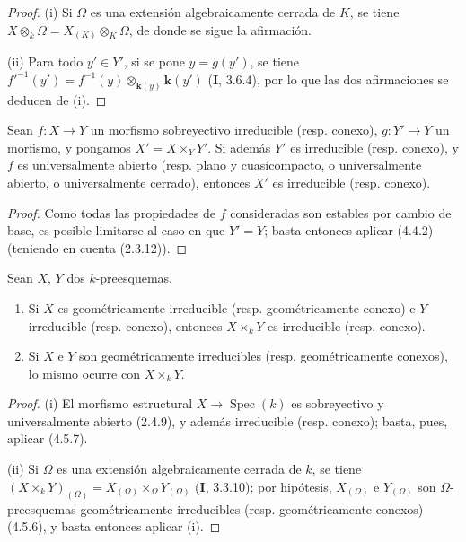 \begin{proof}
(i) Si $\Omega$ es una extensión algebraicamente cerrada de $K$, se
tiene $X\otimes_k\Omega=X_{(K)}\otimes_K\Omega$, de donde se sigue la
afirmación.

(ii) Para todo $y'\in Y'$, si se pone $y=g(y')$, se tiene
$f'^{-1}(y')=f^{-1}(y)\otimes_{\mathbf{k}(y)}\boldsymbol{k}(y')$ (\textbf I, 3.6.4), por lo que las dos
afirmaciones se deducen de (i).
\end{proof}

\begin{proposition}[4.5.7]
\label{IV.2.4.5.7-fr}
Sean $f:X\to Y$ un morfismo sobreyectivo irreducible \textup{(resp.} conexo\textup{)},
$g:Y'\to Y$ un morfismo, y pongamos $X'=X\times_Y Y'$. Si además $Y'$ es
irreducible \textup{(resp.} conexo\textup{)}, y $f$ es universalmente abierto \textup{(resp.} plano y
cuasicompacto, o universalmente abierto, o universalmente cerrado\textup{)}, entonces
$X'$ es irreducible \textup{(resp.} conexo\textup{)}.
\end{proposition}

\begin{proof}
Como todas las propiedades de $f$ consideradas son estables por cambio de
base, es posible limitarse al caso en que $Y'=Y$; basta entonces aplicar (4.4.2)
(teniendo en cuenta (2.3.12)).
\end{proof}

\begin{corollary}[4.5.8]
\label{IV.2.4.5.8-fr}
Sean $X$, $Y$ dos $k$-preesquemas.
\begin{enumerate}
\item[\textup{(i)}] Si $X$ es geométricamente irreducible \textup{(resp.} geométricamente
conexo\textup{)} e $Y$ irreducible \textup{(resp.} conexo\textup{)}, entonces $X\times_k Y$ es
irreducible \textup{(resp.} conexo\textup{)}.
\item[\textup{(ii)}] Si $X$ e $Y$ son geométricamente irreducibles \textup{(resp.}
geométricamente conexos\textup{)}, lo mismo ocurre con $X\times_k Y$.
\end{enumerate}
\end{corollary}

\begin{proof}
(i) El morfismo estructural $X\to\operatorname{Spec}(k)$ es sobreyectivo
y universalmente abierto (2.4.9), y además irreducible (resp. conexo); basta,
pues, aplicar (4.5.7).

(ii) Si $\Omega$ es una extensión algebraicamente cerrada de $k$, se
tiene $(X\times_k Y)_{(\Omega)}=X_{(\Omega)}\times_\Omega Y_{(\Omega)}$
(\textbf I, 3.3.10); por hipótesis, $X_{(\Omega)}$ e $Y_{(\Omega)}$ son
$\Omega$-preesquemas geométricamente irreducibles (resp. geométricamente
conexos) (4.5.6), y basta entonces aplicar (i).
\end{proof}
